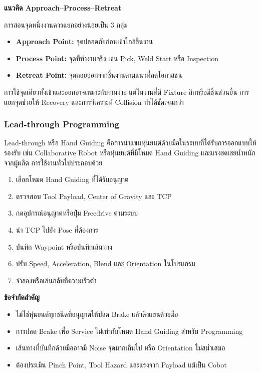 \textbf{แนวคิด Approach–Process–Retreat}

การสอนจุดหนึ่งงานควรแยกอย่างน้อยเป็น 3 กลุ่ม

\begin{itemize}
    \item \textbf{Approach Point:} จุดปลอดภัยก่อนเข้าใกล้ชิ้นงาน
    \item \textbf{Process Point:} จุดที่ทำงานจริง เช่น Pick, Weld Start หรือ Inspection
    \item \textbf{Retreat Point:} จุดถอยออกจากชิ้นงานตามแนวที่ลดโอกาสชน
\end{itemize}

การใช้จุดเดียวทั้งเข้าและออกอาจเหมาะกับงานง่าย แต่ในงานที่มี Fixture ลึกหรือมีชิ้นส่วนยื่น การแยกจุดช่วยให้ Recovery และการวิเคราะห์ Collision ทำได้ชัดเจนกว่า

\subsubsection{Lead-through Programming}

Lead-through หรือ Hand Guiding คือการนำแขนหุ่นยนต์ด้วยมือในระบบที่ได้รับการออกแบบให้รองรับ เช่น Collaborative Robot หรือหุ่นยนต์ที่มีโหมด Hand Guiding และแรงชดเชยน้ำหนักจากผู้ผลิต การใช้งานทั่วไปประกอบด้วย

\begin{enumerate}
    \item เลือกโหมด Hand Guiding ที่ได้รับอนุญาต
    \item ตรวจสอบ Tool Payload, Center of Gravity และ TCP
    \item กดอุปกรณ์อนุญาตหรือปุ่ม Freedrive ตามระบบ
    \item นำ TCP ไปยัง Pose ที่ต้องการ
    \item บันทึก Waypoint หรือบันทึกเส้นทาง
    \item ปรับ Speed, Acceleration, Blend และ Orientation ในโปรแกรม
    \item จำลองหรือเล่นกลับที่ความเร็วต่ำ
\end{enumerate}

\textbf{ข้อจำกัดสำคัญ}

\begin{itemize}
    \item ไม่ใช่หุ่นยนต์ทุกชนิดที่อนุญาตให้ปลด Brake แล้วดึงแขนด้วยมือ
    \item การปลด Brake เพื่อ Service ไม่เท่ากับโหมด Hand Guiding สำหรับ Programming
    \item เส้นทางที่บันทึกด้วยมืออาจมี Noise จุดมากเกินไป หรือ Orientation ไม่สม่ำเสมอ
    \item ต้องประเมิน Pinch Point, Tool Hazard และแรงจาก Payload แม้เป็น Cobot
\end{itemize}


